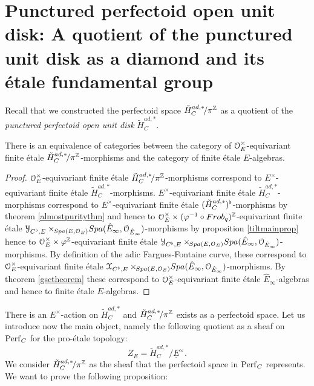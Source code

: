 \section{Punctured perfectoid open unit disk: A quotient of the punctured\\ unit disk as a diamond and its \'{e}tale fundamental group}
Recall that we constructed the perfectoid space $\tilde{H}^{ad, *}_{C}\!/\pi^{\mathbb{Z}}$ as a quotient of the \emph{punctured perfectoid open unit disk} $\tilde{H}^{ad, *}_{C}$. 

\begin{theorem}\label{firstmainthm}
There is an equivalence of categories between
the category of $\mathcal{O}_E^{\times}$-equivariant finite \'{e}tale $\tilde{H}^{ad, *}_{C}\!/\pi^{\mathbb{Z}}$-morphisms and the category of finite \'{e}tale $E$-algebras.
\end{theorem}
\begin{proof}
$\mathcal{O}_E^{\times}$-equivariant finite \'{e}tale $\tilde{H}^{ad, *}_{C}\!/\pi^{\mathbb{Z}}$-morphisms correspond to
$E^{\times}$-equivariant finite \'{e}tale $\tilde{H}^{ad, *}_{C}$-morphisms.
$E^{\times}$-equivariant finite \'{e}tale $\tilde{H}^{ad, *}_{C}$-morphisms  correspond to
$E^{\times}$-equivariant finite \'{e}tale $(\tilde{H}^{ad, *}_{C})^{\flat}$-morphisms by theorem \ref{almostpuritythm} and hence to
$\mathcal{O}_E^{\times}\times(\varphi^{-1}\circ Frob_q)^{\mathbb{Z}}$-equivariant finite \'{e}tale 
$\mathcal{Y}_{C^{\flat},E}\times\!\!_{{Spa({E},{\mathcal{O}_E})}}{Spa({\hat{E}_{\infty}},{\mathcal{O}_{\hat{E}_{\infty}}})}$-morphisms
by proposition \ref{tiltmainprop} hence to 
$\mathcal{O}_E^{\times}\times\varphi^{\mathbb{Z}}$-equivariant finite \'{e}tale 
$\mathcal{Y}_{C^{\flat},E}\times\!\!_{{Spa({E},{\mathcal{O}_E})}}{Spa({\hat{E}_{\infty}},{\mathcal{O}_{\hat{E}_{\infty}}})}$-morphisms.
By definition of the adic Fargues-Fontaine curve, these correspond to 
$\mathcal{O}_E^{\times}$-equivariant finite \'{e}tale 
$\mathcal{X}_{C^{\flat},E}\times\!\!_{{Spa({E},{\mathcal{O}_E})}}{Spa({\hat{E}_{\infty}},{\mathcal{O}_{\hat{E}_{\infty}}})}$-morphisms.
By theorem \ref{gsctheorem} these correspond to
$\mathcal{O}_E^{\times}$-equivariant finite \'etale $\hat{E}_{\infty}$-algebras and hence to
finite \'{e}tale $E$-algebras.
\end{proof}

There is an $E^{\times}$-action on $\tilde{H}^{ad, *}_{C}$ and  $\tilde{H}^{ad, *}_{C}\!/\pi^{\mathbb{Z}}$ exists as a perfectoid space. Let us introduce now the main object, namely the following quotient as a sheaf on $\mathrm{Perf}_{C}$ for the pro-\'{e}tale topology:
\[Z_E = \tilde{H}^{ad, *}_{C}\!/\underline{E}^{\times}.\]
We consider $\tilde{H}^{ad, *}_{C}\!/\pi^{\mathbb{Z}}$ as the sheaf that the perfectoid space in $\mathrm{Perf}_{C}$ represents.
We want to prove the following proposition:


